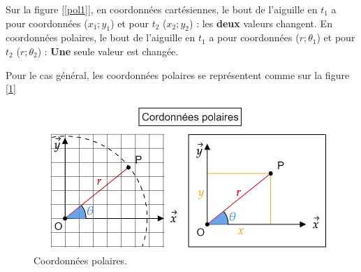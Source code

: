 \documentclass[
	11pt, %
	fleqn, %
	a4paper, %
]{LegrandOrangeBook}
\begin{document}
Sur la figure [\ref{pol1}], en coordonnées cartésiennes, le bout de l'aiguille en $t_1$ a pour coordonnées ($x_1; y_1$) et pour $t_2$ ($x_2 ; y_2$) : les \textbf{deux} valeurs changent. 
En coordonnées polaires, le bout de l'aiguille en $t_1$ a pour coordonnées ($r ; \theta_1$) et pour $t_2$ ($r ; \theta_2 $) : \textbf{Une} seule valeur est changée.

Pour le cas général, les coordonnées polaires se représentent comme sur la figure [\ref{pol2}]

\begin{figure}[H] %
	\centering %
	\includegraphics[width=1\textwidth]{Images/pol2.png} %
	\caption{Coordonnées polaires.}
	\label{pol2} %
\end{figure}
\end{document}
